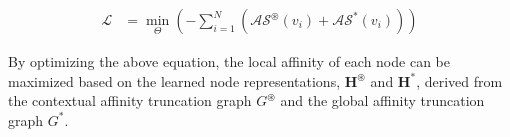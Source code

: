 \documentclass{article}
\begin{document}
\begin{equation}
\begin{aligned}
    \mathcal{L} &=\min\limits_{\Theta}\left( - \sum_{i=1}^{N} \left(\mathcal{AS}^{\circledast}({v_i}) + \mathcal{AS}^{*}({v_i}) \right) \right)
\end{aligned}
\label{eq: objective}
\end{equation}

By optimizing the above equation, the local affinity of each node can be maximized based on the learned node representations, $\mathbf{H}^{\circledast}$ and $\mathbf{H}^{*}$, derived from the contextual affinity truncation graph $G^{\circledast}$ and the global affinity truncation graph $G^{*}$. 

















\end{document}
